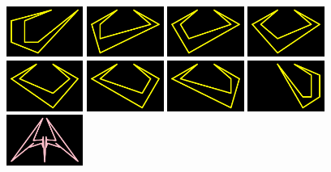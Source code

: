 \lhead[]{}
\rhead[]{}
\renewcommand{\headrulewidth}{0pt}
\ %
\newpage
\vspace*{\fill}
\begin{figure}[H]
  \centering
    \includegraphics[width=2.5cm]{preface/vector_images/vec_image_curs1.png}
    \includegraphics[width=2.5cm]{preface/vector_images/vec_image_curs2.png}
    \includegraphics[width=2.5cm]{preface/vector_images/vec_image_curs3.png}
    \includegraphics[width=2.5cm]{preface/vector_images/vec_image_curs4.png}
    \includegraphics[width=2.5cm]{preface/vector_images/vec_image_curs5.png}
    \includegraphics[width=2.5cm]{preface/vector_images/vec_image_curs6.png}
    \includegraphics[width=2.5cm]{preface/vector_images/vec_image_curs7.png}
    \includegraphics[width=2.5cm]{preface/vector_images/vec_image_curs8.png}
    \includegraphics[width=2.5cm]{preface/vector_images/vec_image_ener11.png}

\end{figure}
